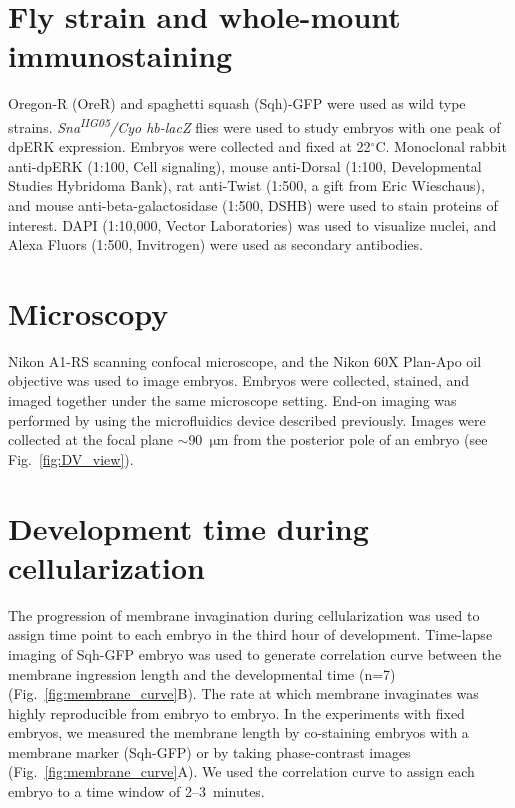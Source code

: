\documentclass{pnastwo}
\newcommand{\fig}[0]{Fig.}
\begin{document}
\begin{article}




\begin{materials}

\section{Fly strain and whole-mount immunostaining}
%
Oregon-R (OreR) and spaghetti squash (Sqh)-GFP were used as wild type strains. 
%
{\it Sna\textsuperscript{\it IIG05}/Cyo hb-lacZ} flies were used to study embryos with one peak of dpERK expression.  
%
Embryos were collected and fixed at 22$^\circ$C. 
%
Monoclonal rabbit anti-dpERK (1:100, Cell signaling), mouse anti-Dorsal (1:100, Developmental Studies Hybridoma Bank), rat anti-Twist (1:500, a gift from Eric Wieschaus), and mouse anti-beta-galactosidase (1:500, DSHB) were used to stain proteins of interest. DAPI (1:10,000, Vector Laboratories) was used to visualize nuclei, and Alexa Fluors (1:500, Invitrogen) were used as secondary antibodies. 

\section{Microscopy}
%
Nikon A1-RS scanning confocal microscope, and the Nikon 60X Plan-Apo oil objective was used to image embryos. Embryos were collected, stained, and imaged together under the same microscope setting. End-on imaging was performed by using the microfluidics device described previously. Images were collected at the focal plane $\sim$90~$\mathrm{\mu m}$ from the posterior pole of an embryo (see \fig~\ref{fig:DV_view}). 

\section{Development time during cellularization} 
%
The progression of membrane invagination during cellularization was used to assign time point to each embryo in the third hour of development. Time-lapse imaging of Sqh-GFP embryo was used to generate correlation curve between the membrane ingression length and the developmental time (n=7) (\fig~\ref{fig:membrane_curve}B). The rate at which membrane invaginates was highly reproducible from embryo to embryo. In the experiments with fixed embryos, we measured the membrane length by co-staining embryos with a membrane marker (Sqh-GFP) or by taking phase-contrast images (\fig~\ref{fig:membrane_curve}A). We used the correlation curve to assign each embryo to a time window of 2--3~minutes. 


\end{materials}
\end{article}
\end{document}
